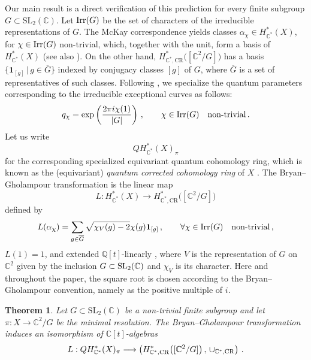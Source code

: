 \documentclass[a4paper,reqno]{amsart}
\theoremstyle{plain} %
\newtheorem{thm}{Theorem}[section]
\theoremstyle{definition} %
\theoremstyle{remark} %
\newcommand{\Q}{\mathbb{Q}}
\newcommand{\C}{\mathbb{C}}
\newcommand{\fo}{\mathbf{1}}
\newcommand{\1}{\mathds{1}}   %
\begin{document}
Our main result is a direct verification of this prediction for every
finite subgroup $G\subset \mathrm{SL}_2(\mathbb C)$.
Let ${\rm Irr} (G)$ be the set  of characters of the irreducible representations of $G$.
The McKay correspondence yields classes \(\alpha_\chi \in H^*_{\C^*}(X) \), 
for $\chi \in {\rm Irr} (G)$ non-trivial, which, together with the unit, form a basis
 of $H^*_{\C^*}(X)$ \cite{GSVMcKay} (see also \cite{McKay, ReidMcKay, DolgachevMcKay}).
On the other hand,  $H^*_{\mathbb C^*,\mathrm{CR}} \bigl([\mathbb C^2/G]\bigr)$
has a basis $\{ \fo_{[g]} \, | \, g\in \overline{G}\}$ indexed by conjugacy classes $[g]$ of $G$, where $\overline{G}$
is a set of representatives of such classes.
Following \cite{bryan2008root, BG09}, we specialize the quantum parameters corresponding to the irreducible exceptional curves
as follows:
\begin{equation}\label{BGq}
q_\chi = \exp \left( \frac{2\pi i \chi (1)}{|G|} \right) \, , \qquad \chi \in {\rm Irr} (G) \quad \mbox{non-trivial} \, .
\end{equation}
Let us write
\begin{equation}\label{qccr}
QH^*_{\mathbb C^*}(X)_{\pi}
\end{equation}
for the corresponding specialized equivariant quantum cohomology ring, 
which is known as the (equivariant) \textit{quantum corrected cohomology ring} of $X$ \cite{RuanCCRC}.
The Bryan--Gholampour transformation is the linear map
\[
L \colon H^*_{\C^*}(X) \longrightarrow H^*_{\mathbb C^*,\mathrm{CR}} \bigl([\mathbb C^2/G]\bigr)
\]
defined by
\begin{equation}\label{BGLintro}
L (\alpha_\chi) = \sum_{g\in \overline{G}} \sqrt{\chi_V(g) -2} \chi (g) \fo_{[g]} \, , \qquad \forall \chi \in {\rm Irr} (G)
\quad \mbox{non-trivial} \, ,
\end{equation}
$L(1)=1$, and extended $\Q[t]$-linearly \cite{bryan2008root}, where $V$ is the  representation of $G$ on $\C^2$
given by the inclusion $G\subset {\rm SL}_2(\C)$ and $\chi_V$ is  its character. 
Here and throughout
the paper, the square root is chosen according to the
Bryan--Gholampour convention, namely as the positive multiple of $i$.

\begin{thm}\label{mainthm}
Let $G\subset \mathrm{SL}_2(\mathbb C)$ be a non-trivial finite subgroup and let
$\pi \colon X\to\mathbb C^2/G$ be the minimal resolution. The
Bryan--Gholampour transformation induces an isomorphism of
$\mathbb C[t]$-algebras
\[
L:
QH^*_{\mathbb C^*}(X)_{\pi}
\longrightarrow
\left( H^*_{\mathbb C^*,\mathrm{CR}}
\bigl([\mathbb C^2/G]\bigr) \, , \, \cup_{\C^*, {\rm CR}} \right) \, .
\]
\end{thm}
\end{document}
